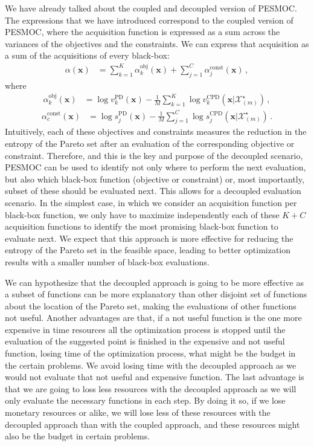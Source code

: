 We have already talked about the coupled and decoupled version of PESMOC. The expressions that we have introduced correspond to the coupled version of PESMOC, where the acquisition function is expressed as a sum across the variances of the objectives and the constraints. We can express that acquisition as a sum of the acquisitions of every black-box:
\begin{align}
\alpha(\mathbf{x}) &= \sum_{k=1}^K \alpha^\text{obj}_k(\mathbf{x}) + \sum_{j=1}^C \alpha^\text{const}_j(\mathbf{x})\,,
\end{align}
where
\begin{align}
\alpha^\text{obj}_k(\mathbf{x}) & 
        = \log v_k^{\text{PD}}(\textbf{x}) - \frac{1}{M}\sum_{k=1}^{K}\log v_k^{\text{CPD}} (\textbf{x}|\mathcal{X}^{\star}_{(m)})\,,
\end{align}
\begin{align}
\alpha^\text{const}_c(\mathbf{x}) &
        = \log s_j^{\text{PD}}(\textbf{x}) - \frac{1}{M}\sum_{j=1}^{C}\log s_j^{\text{CPD}}(\textbf{x}|\mathcal{X}^{\star}_{(m)})\,.
\end{align}
Intuitively, each of these objectives and constraints measures the reduction in the entropy of the Pareto set after an evaluation
of the corresponding objective or constraint. Therefore, and this is the key and purpose of the decoupled scenario, PESMOC can be used to identify not only where to perform
the next evaluation, but also which black-box function (objective or constraint) or, most importantly, subset of these should be evaluated
next. This allows for a decoupled evaluation scenario. In the simplest case, in which we consider an acquisition function
per black-box function, we only have to maximize independently each of these $K+C$ acquisition functions to identify the
most promising black-box function to evaluate next. We expect that this approach is more effective for
reducing the entropy of the Pareto set in the feasible space, leading to better optimization results with
a smaller number of black-box evaluations. 

We can hypothesize that the decoupled approach is going to be more effective as a subset of functions can be more explanatory than other disjoint set of functions about the location of the Pareto set, making the evaluations of other functions not useful. Another advantages are that, if a not useful function is the one more expensive in time resources all the optimization process is stopped until the evaluation of the suggested point is finished in the expensive and not useful function, losing time of the optimization process, what might be the budget in the certain problems. We avoid losing time with the decoupled approach as we would not evaluate that not useful and expensive function. The last advantage is that we are going to loss less resources with the decoupled approach as we will only evaluate the necessary functions in each step. By doing it so, if we lose monetary resources or alike, we will lose less of these resources with the decoupled approach than with the coupled approach, and these resources might also be the budget in certain problems.

